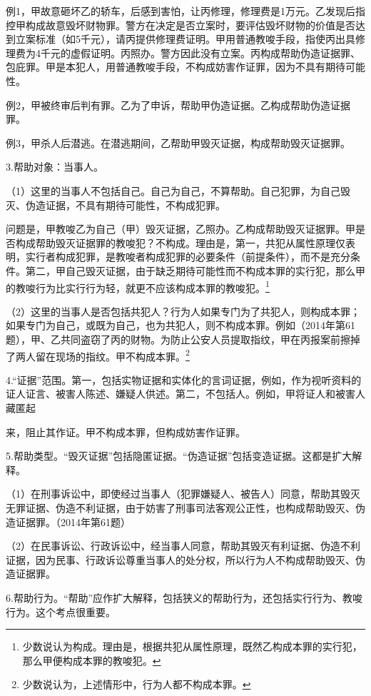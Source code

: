 例1，甲故意砸坏乙的轿车，后感到害怕，让丙修理，修理费是1万元。乙发现后指控甲构成故意毁坏财物罪。警方在决定是否立案时，要评估毁坏财物的价值是否达到立案标准（如5千元），请丙提供修理费证明。甲用普通教唆手段，指使丙出具修理费为4千元的虚假证明。丙照办。警方因此没有立案。丙构成帮助伪造证据罪、包庇罪。甲是本犯人，用普通教唆手段，不构成妨害作证罪，因为不具有期待可能性。

例2，甲被终审后判有罪。乙为了申诉，帮助甲伪造证据。乙构成帮助伪造证据罪。

例3，甲杀人后潜逃。在潜逃期间，乙帮助甲毁灭证据，构成帮助毁灭证据罪。

3.帮助对象：当事人。

（1）这里的当事人不包括自己。自己为自己，不算帮助。自己犯罪，为自己毁灭、伪造证据，不具有期待可能性，不构成犯罪。

问题是，甲教唆乙为自己（甲）毁灭证据，乙照办。乙构成帮助毁灭证据罪。甲是否构成帮助毁灭证据罪的教唆犯？不构成。理由是，第一，共犯从属性原理仅表明，实行者构成犯罪，是教唆者构成犯罪的必要条件（前提条件），而不是充分条件。第二，甲自己毁灭证据，由于缺乏期待可能性而不构成本罪的实行犯，那么甲的教唆行为比实行行为轻，就更不应该构成本罪的教唆犯。\footnote{少数说认为构成。理由是，根据共犯从属性原理，既然乙构成本罪的实行犯，那么甲便构成本罪的教唆犯。}

（2）这里的当事人是否包括共犯人？行为人如果专门为了共犯人，则构成本罪；如果专门为自己，或既为自己，也为共犯人，则不构成本罪。例如（2014年第61题），甲、乙共同盗窃了丙的财物。为防止公安人员提取指纹，甲在丙报案前擦掉了两人留在现场的指纹。甲不构成本罪。\footnote{少数说认为，上述情形中，行为人都不构成本罪。}

4.“证据”范围。第一，包括实物证据和实体化的言词证据，例如，作为视听资料的证人证言、被害人陈述、嫌疑人供述。第二，不包括人。例如，甲将证人和被害人藏匿起

来，阻止其作证。甲不构成本罪，但构成妨害作证罪。

5.帮助类型。“毁灭证据”包括隐匿证据。“伪造证据”包括变造证据。这都是扩大解释。

（1）在刑事诉讼中，即使经过当事人（犯罪嫌疑人、被告人）同意，帮助其毁灭无罪证据、伪造不利证据，由于妨害了刑事司法客观公正性，也构成帮助毁灭、伪造证据罪。（2014年第61题）

（2）在民事诉讼、行政诉讼中，经当事人同意，帮助其毁灭有利证据、伪造不利证据，因为民事、行政诉讼尊重当事人的处分权，所以行为人不构成帮助毁灭、伪造证据罪。

6.帮助行为。“帮助”应作扩大解释，包括狭义的帮助行为，还包括实行行为、教唆行为。这个考点很重要。

